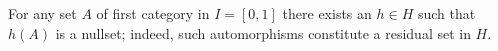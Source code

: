 For any set $A$ of first category in $I = [0, 1]$ there exists an $h \in H$ such that $h(A)$ is a nullset; indeed, such automorphisms constitute a residual set in $H$.
